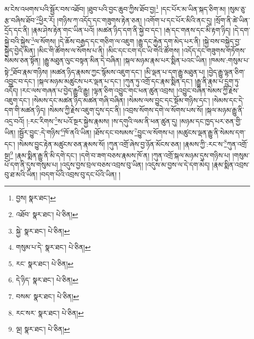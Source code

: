 མ་ངེས་འཕགས་པའི་སྦྱོར་བས་འཐོབ། །ཐུབ་པའི་བྱང་ཆུབ་ཀྱིས་ཐོབ་བྱ།\footnote{བྱས།  སྣར་ཐང་། } །དང་པོར་མ་ཡིན་སྐད་ཅིག་མ། །སུམ་ཅུ་རྩ་བཞིས་ཐོབ་\footnote{འཐོབ་  སྣར་ཐང་།  པེ་ཅིན། }ཕྱིར་རོ། །གཉིས་ཀ་འདོད་དང་གཟུགས་རྟེན་ཅན། །འགོག་པ་དང་པོར་མིའི་ནང་དུ། །སྲོག་ནི་ཚེ་ཡིན་དྲོད་དང་ནི། །རྣམ་ཤེས་རྟེན་གང་ཡིན་པའོ། །མཚན་ཉིད་དག་ནི་སྐྱེ་བ་དང་། །རྒ་དང་གནས་དང་མི་རྟག་ཉིད། །དེ་དག་སྐྱེ་བའི་སྐྱེས་\footnote{སྐྱེ་  སྣར་ཐང་།  པེ་ཅིན། }ལ་སོགས། །དེ་ཆོས་བརྒྱད་དང་གཅིག་ལ་འཇུག །རྒྱུ་དང་རྐྱེན་དག་མེད་པར་ནི། །སྐྱེ་བས་བསྐྱེད་བྱ་སྐྱེད་བྱེད་མིན། །མིང་གི་ཚོགས་ལ་སོགས་པ་ནི། །མིང་དང་ངག་དང་ཡི་གེའི་ཚོགས། །འདོད་དང་གཟུགས་གཏོགས་སེམས་ཅན་སྟོན། །རྒྱུ་མཐུན་ལུང་བསྟན་མིན་དེ་བཞིན། །སྐལ་མཉམ་རྣམ་པར་སྨིན་པའང་ཡིན། །ཁམས་:གསུམ་པ་སྟེ་\footnote{གསུམ་པ་དེ་  སྣར་ཐང་།  པེ་ཅིན། }ཐོབ་རྣམ་གཉིས། །མཚན་ཉིད་རྣམས་ཀྱང་སྙོམས་འཇུག་དང་། །མི་ལྡན་པ་དག་རྒྱུ་མཐུན་པ། །བྱེད་རྒྱུ་ལྷན་ཅིག་འབྱུང་བ་དང་། །སྐལ་མཉམ་མཚུངས་པར་ལྡན་པ་དང་། །ཀུན་ཏུ་འགྲོ་དང་རྣམ་སྨིན་དང་། །རྒྱུ་ནི་རྣམ་པ་དྲུག་ཏུ་འདོད། །རང་ལས་གཞན་པ་བྱེད་རྒྱུའི་རྒྱུ། །ལྷན་ཅིག་འབྱུང་གང་ཕན་ཚུན་འབྲས། །འབྱུང་བཞིན་སེམས་ཀྱི་རྗེས་འཇུག་དང་། །སེམས་དང་མཚན་ཉིད་མཚན་གཞི་བཞིན། །སེམས་ལས་བྱུང་དང་སྡོམ་གཉིས་དང་། །སེམས་དང་དེ་དག་གི་མཚན་ཉིད། །སེམས་ཀྱི་རྗེས་འཇུག་དུས་དང་ནི། །འབྲས་སོགས་དགེ་ལ་སོགས་པས་སོ། །སྐལ་མཉམ་རྒྱུ་ནི་འདྲ་བའོ། །:རང་རིགས་\footnote{རང་  སྣར་ཐང་།  པེ་ཅིན། }ས་པའོ་སྔར་སྐྱེས་རྣམས། །ས་དགུའི་ལམ་ནི་ཕན་ཚུན་དུ། །མཉམ་དང་ཁྱད་པར་ཅན་གྱི་ཡིན། །སྦྱོར་བྱུང་:དེ་གཉིས་\footnote{དེ་ཉིད་  སྣར་ཐང་།  པེ་ཅིན། }ཁོ་ནའི་ཡིན། །ཐོས་དང་བསམས་\footnote{བསམ་  སྣར་ཐང་།  པེ་ཅིན། }བྱུང་ལ་སོགས་པ། །མཚུངས་ལྡན་རྒྱུ་ནི་སེམས་དག་དང་། །སེམས་བྱུང་རྟེན་མཚུངས་ཅན་རྣམས་སོ། །ཀུན་འགྲོ་ཞེས་བྱ་ཉོན་མོངས་ཅན། །རྣམས་ཀྱི་:རང་ས་\footnote{རང་སར་  སྣར་ཐང་།  པེ་ཅིན། }ཀུན་འགྲོ་སྔ།\footnote{ལྔ།  སྣར་ཐང་།  པེ་ཅིན། } །རྣམ་སྨིན་རྒྱུ་ནི་མི་དགེ་དང་། །དགེ་བ་ཟག་བཅས་རྣམས་ཁོ་ན། །ཀུན་འགྲོ་སྐལ་མཉམ་དུས་གཉིས་པ། །གསུམ་པོ་དག་ནི་དུས་གསུམ་པ། །འདུས་བྱས་བྲལ་བཅས་འབྲས་བུ་ཡིན། །འདུས་མ་བྱས་ལ་དེ་དག་མེད། །རྣམ་སྨིན་འབྲས་བུ་ཐ་མའི་ཡིན། །བདག་པོའི་འབྲས་བུ་དང་པོའི་ཡིན། །
